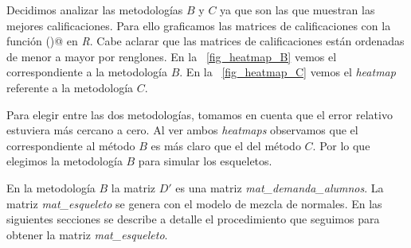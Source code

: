 Decidimos analizar las metodologías $B$ y $C$ ya que son las que muestran las mejores calificaciones. Para ello graficamos las matrices de calificaciones con la función \verb@heatmap()@ en \textit{R}. Cabe aclarar que las matrices de calificaciones están ordenadas de menor a mayor por renglones. En la \figurename{~\ref{fig_heatmap_B}} vemos el correspondiente a la metodología $B$. En la \figurename{~\ref{fig_heatmap_C}} vemos el \textit{heatmap} referente a la metodología $C$.


%


Para elegir entre las dos metodologías, tomamos en cuenta que el error relativo estuviera más cercano a cero. Al ver ambos \textit{heatmaps} observamos que el correspondiente al método $B$ es más claro que el del método $C$. Por lo que elegimos la metodología $B$ para simular los esqueletos. %
                                                                                                                                                                                                                                                                                                                                                                                                                                                                                  
                                                                                                                                                                                                                                                                                                                                                                                                                                                                                  En la metodología $B$ la matriz $D'$ es una matriz \textit{mat\_demanda\_alumnos}. La matriz \textit{mat\_esqueleto} se genera con el modelo de mezcla de normales. En las siguientes secciones se describe a detalle el procedimiento que seguimos para obtener la matriz \textit{mat\_esqueleto}. %

